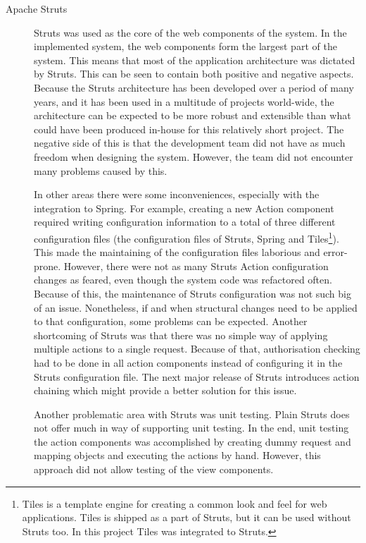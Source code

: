 \begin{description}

\item[Apache Struts] Struts was used as the core of the web components 
of the system. In the implemented system, the web components form the 
largest part of the system. This means that most of the application 
architecture was dictated by Struts. This can be seen to contain both 
positive and negative aspects. Because the Struts architecture has 
been developed over a period of many years, and it has been used in a 
multitude of projects world-wide, the architecture can be expected to 
be more robust and extensible than what could have been produced 
in-house for this relatively short project. The negative side of this 
is that the development team did not have as much freedom when 
designing the system. However, the team did not encounter many 
problems caused by this.

In other areas there were some inconveniences, especially with the 
integration to Spring. For example, creating a new Action component 
required writing configuration information to a total of three 
different configuration files (the configuration files of Struts, 
Spring and Tiles\footnote{Tiles is a template engine for creating a 
common look and feel for web applications. Tiles is shipped as a part 
of Struts, but it can be used without Struts too. In this project 
Tiles was integrated to Struts.}). This made the maintaining of the 
configuration files laborious and error-prone. However, there were not 
as many Struts Action configuration changes as feared, even though the 
system code was refactored often. Because of this, the maintenance of 
Struts configuration was not such big of an issue. Nonetheless, if and 
when structural changes need to be applied to that configuration, some 
problems can be expected. Another shortcoming of Struts was that there 
was no simple way of applying multiple actions to a single request. 
Because of that, authorisation checking had to be done in all action 
components instead of configuring it in the Struts configuration file. 
The next major release of Struts introduces action chaining which 
might provide a better solution for this issue.

Another problematic area with Struts was unit testing. Plain Struts 
does not offer much in way of supporting unit testing. In the end, 
unit testing the action components was accomplished by creating dummy 
request and mapping objects and executing the actions by hand. 
However, this approach did not allow testing of the view components.


\end{description}
